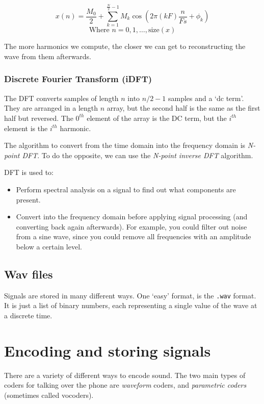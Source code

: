 \[
  x(n) = \frac{M_0}{2} + \sum\limits^{\frac{N}{2}-1}_{k=1}M_k\cos\left(2\pi (kF)\frac{n}{Fs} + \phi_k\right)
\]
\[
  \text{Where } n = 0,1,\dots,\text{size}(x)
\]

The more harmonics we compute, the closer we can get to reconstructing the wave
from them afterwards.

\subsubsection{Discrete Fourier Transform (iDFT)}

The DFT converts samples of length $n$ into $n/2 - 1$ samples and a `dc term'.
They are arranged in a length $n$ array, but the second half is the same as the
first half but reversed. The $0^{th}$ element of the array is the DC term, but
the $i^{th}$ element is the $i^{th}$ harmonic. 

The algorithm to convert from the time domain into the frequency domain is
\textit{N-point DFT}. To do the opposite, we can use the \textit{N-point inverse
DFT} algorithm.

DFT is used to:

\begin{itemize}
  \item Perform spectral analysis on a signal to find out what components are 
    present.
  \item Convert into the frequency domain before applying signal processing (and
    converting back again afterwards). For example, you could filter out noise 
    from a sine wave, since you could remove all frequencies with an amplitude
    below a certain level.
\end{itemize}

\subsection{Wav files}

Signals are stored in many different ways. One `easy' format, is the
\texttt{.wav} format. It is just a list of binary numbers, each representing a
single value of the wave at a discrete time.



\section{Encoding and storing signals}

There are a variety of different ways to encode sound. The two main types of
coders for talking over the phone are \textit{waveform} coders, and
\textit{parametric coders} (sometimes called vocoders).

